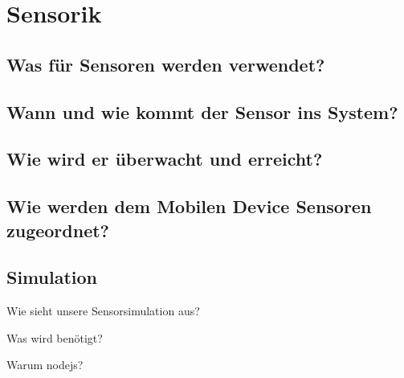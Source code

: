 \section{Sensorik}

\subsection{Was für Sensoren werden verwendet?}


\subsection{Wann und wie kommt der Sensor ins System?}

\subsection{Wie wird er überwacht und erreicht?}

\subsection{Wie werden dem Mobilen Device Sensoren zugeordnet?}




\subsection{Simulation}

Wie sieht unsere Sensorsimulation aus? 

Was wird benötigt? 

Warum nodejs?